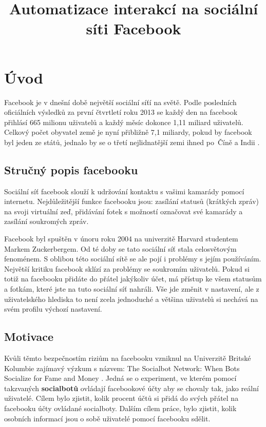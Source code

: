 \documentclass[thesis=M,czech]{FITthesis}[2013/05/10]
\title{Automatizace interakcí na sociální síti Facebook}
\begin{document}


\chapter{{\' U}vod}

Facebook je v dnešní době největší sociální síťí na světě. Podle posledních oficiálních výsledků \cite{web:fbMonthlyActiveUsers} za první čtvrtletí roku 2013 se každý den na facebook přihlásí 665 milionu uživatelů a každý měsíc dokonce 1,11 miliard uživatelů. Celkový počet obyvatel země je nyní přibližně 7,1 miliardy, pokud by facebook byl jeden ze států, jednalo by se o třetí nejlidnatější zemi ihned po~Číně a Indii \cite{web:socialbotNetwork}.

\section{Stručný popis facebooku}

Sociální síť facebook slouží k udržování kontaktu s vašimi kamarády pomocí internetu. Nejdůležitější funkce facebooku jsou: zasílání statusů (krátkých zpráv) na svoji virtuální zeď, přidávání fotek s možností označovat své kamarády a zasílání soukromých zpráv.

Facebook byl spuštěn v únoru roku 2004 na univerzitě Harvard studentem Markem Zuckerbergem. Od té doby se tato sociální síť stala celosvětovým fenoménem. S oblibou této sociální sítě se ale pojí i problémy s jejím používáním. Největší kritiku facebook sklízí za problémy se soukromím uživatelů. Pokud si totiž na facebooku přidáte do přátel jakýkoliv účet, má přístup ke všem statusům a fotkám, které jste na tuto sociální síť nahráli. Vše jde změnit v nastavení, ale z uživatelského hlediska to není zcela jednoduché a většina uživatelů si nechává na svém profilu výchozí nastavení.

\section{Motivace}

Kvůli těmto bezpečnostím riziům na facebooku vzniknul na Univerzitě Britské Kolumbie zajímavý výzkum s názvem: The Socialbot Network:
When Bots Socialize for Fame and Money \cite{web:socialbotNetwork}. Jedná se o experiment, ve kterém pomocí takzvaných \textbf{socialbotů} ovládají facebookové účty aby se chovaly tak, jako reální uživatelé. Cílem bylo zjistit, kolik procent účtů si přidá do svých přátel na facebooku účty ovládané socialboty. Dalším cílem práce, bylo zjistit, kolik osobních informací jsou o sobě uživatelé pomocí facebooku sdělit.
\end{document}
